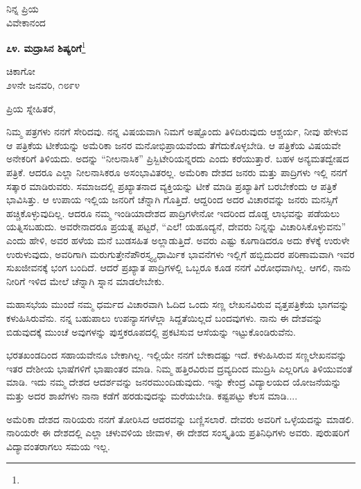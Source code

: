{\flushright
ನಿನ್ನ ಪ್ರಿಯ\\ವಿವೇಕಾನಂದ\par}

\newpage

\begin{center}
\textbf{೭೪. ಮದ್ರಾಸಿನ ಶಿಷ್ಯರಿಗೆ}\footnote{}
\end{center}

\begin{flushright}
ಚಿಕಾಗೋ\\೨೪ನೇ ಜನವರಿ, ೧೮೯೪
\end{flushright}

\noindent
ಪ್ರಿಯ ಸ್ನೇಹಿತರೆ,

ನಿಮ್ಮ ಪತ್ರಗಳು ನನಗೆ ಸೇರಿದವು. ನನ್ನ ವಿಷಯವಾಗಿ ನಿಮಗೆ ಅಷ್ಟೊಂದು ತಿಳಿದಿರುವುದು ಆಶ್ಚರ್ಯ, ನೀವು ಹೇಳುವ ಆ ಪತ್ರಿಕೆಯ ಟೀಕೆಯನ್ನು ಅಮೆರಿಕಾ ಜನರ ಮನೋಭಿಪ್ರಾಯವೆಂದು ತೆಗೆದುಕೊಳ್ಳಬೇಡಿ. ಆ ಪತ್ರಿಕೆಯ ವಿಷಯವೇ ಅನೇಕರಿಗೆ ತಿಳಿಯದು. ಅದನ್ನು “ನೀಲನಾಸಿಕ” ಪ್ರಿಸ್ಬಿಟೇರಿಯನ್ನರದು ಎಂದು ಕರೆಯುತ್ತಾರೆ. ಬಹಳ ಅನ್ಯಮತದ್ವೇಷದ ಪತ್ರಿಕೆ. ಆದರೂ ಎಲ್ಲಾ ನೀಲನಾಸಿಕರೂ ಅಸಂಭಾವಿತರಲ್ಲ. ಅಮೆರಿಕಾ ದೇಶದ ಜನರು ಮತ್ತು ಪಾದ್ರಿಗಳು ಇಲ್ಲಿ ನನಗೆ ಸತ್ಕಾರ ಮಾಡಿರುವರು. ಸಮಾಜದಲ್ಲಿ ಪ್ರಖ್ಯಾತನಾದ ವ್ಯಕ್ತಿಯನ್ನು ಟೀಕೆ ಮಾಡಿ ಪ್ರಖ್ಯಾತಿಗೆ ಬರಬೇಕೆಂದು ಆ ಪತ್ರಿಕೆ ಭಾವಿಸಿತ್ತು. ಆ ಉಪಾಯ ಇಲ್ಲಿಯ ಜನರಿಗೆ ಚೆನ್ನಾಗಿ ಗೊತ್ತಿದೆ. ಆದ್ದರಿಂದ ಅದರ ವಿಚಾರವನ್ನು ಜನರು ಮನಸ್ಸಿಗೆ ಹಚ್ಚಿಕೊಳ್ಳುವುದಿಲ್ಲ. ಆದರೂ ನಮ್ಮ ಇಂಡಿಯಾದೇಶದ ಪಾದ್ರಿಗಳೇನೋ ಇದರಿಂದ ದೊಡ್ಡ ಲಾಭವನ್ನು ಪಡೆಯಲು ಯತ್ನಿಸಬಹುದು. ಅವರೇನಾದರೂ ಪ್ರಯತ್ನ ಪಟ್ಟರೆ, “ಎಲೆ! ಯಹೂದ್ಯನೆ, ದೇವರು ನಿನ್ನನ್ನು ವಿಚಾರಿಸಿಕೊಳ್ಳುವನು” ಎಂದು ಹೇಳಿ, ಅವರ ಹಳೆಯ ಮನೆ ಬುಡಸಹಿತ ಅಲ್ಲಾಡುತ್ತಿದೆ. ಅವರು ಎಷ್ಟು ಕೂಗಾಡಿದರೂ ಅದು ಕೆಳಕ್ಕೆ ಉರುಳೇ ಉರುಳುವುದು, ಅವರಿಗಾಗಿ ಮರುಗುತ್ತೇನೆ\enginline{-}ಪೌರಸ್ತ್ಯ್ಯ ಧಾರ್ಮಿಕ ಭಾವನೆಗಳು ಇಲ್ಲಿಗೆ ಹಬ್ಬಿದುದರ ಪರಿಣಾಮವಾಗಿ ಇವರ ಸುಖಜೀವನಕ್ಕೆ ಭಂಗ ಬಂದಿದೆ. ಆದರೆ ಪ್ರಖ್ಯಾತ ಪಾದ್ರಿಗಳಲ್ಲಿ ಒಬ್ಬರೂ ಕೂಡ ನನಗೆ ವಿರೋಧವಾಗಿಲ್ಲ. ಆಗಲಿ, ನಾನು ನೀರಿಗೆ ಇಳಿದ ಮೇಲೆ ಚೆನ್ನಾಗಿ ಸ್ನಾನ ಮಾಡಲೇಬೇಕು.

ಮಹಾಸಭೆಯ ಮುಂದೆ ನಮ್ಮ ಧರ್ಮದ ವಿಚಾರವಾಗಿ ಓದಿದ ಒಂದು ಸಣ್ಣ ಲೇಖನವಿರುವ ವೃತ್ತಪತ್ರಿಕೆಯ ಭಾಗವನ್ನು ಕಳುಹಿಸಿರುವೆನು. ನನ್ನ ಬಹುಪಾಲು ಉಪನ್ಯಾಸಗಳೆಲ್ಲಾ ಸಿದ್ದತೆಯಿಲ್ಲದೆ ಬಂದವುಗಳು. ನಾನು ಈ ದೇಶವನ್ನು ಬಿಡುವುದಕ್ಕೆ ಮುಂಚೆ ಅವುಗಳನ್ನು ಪುಸ್ತಕರೂಪದಲ್ಲಿ ಪ್ರಕಟಿಸುವ ಆಸೆಯನ್ನು ಇಟ್ಟುಕೊಂಡಿರುವೆನು.

ಭರತಖಂಡದಿಂದ ಸಹಾಯವೇನೂ ಬೇಕಾಗಿಲ್ಲ. ಇಲ್ಲಿಯೇ ನನಗೆ ಬೇಕಾದಷ್ಟು ಇದೆ. ಕಳುಹಿಸಿರುವ ಸಣ್ಣಲೇಖನವನ್ನು ಇತರ ದೇಶೀಯ ಭಾಷೆಗಳಿಗೆ ಭಾಷಾಂತರ ಮಾಡಿ. ನಿಮ್ಮ ಹತ್ತಿರವಿರುವ ದ್ರವ್ಯದಿಂದ ಮುದ್ರಿಸಿ ಎಲ್ಲರಿಗೂ ತಿಳಿಯುವಂತೆ ಮಾಡಿ. ಇದು ನಮ್ಮ ದೇಶದ ಆದರ್ಶವನ್ನು ಜನರಮುಂದಿಡುವುದು. ಇನ್ನು ಕೇಂದ್ರ ವಿದ್ಯಾಲಯದ ಯೋಜನೆಯನ್ನು ಮತ್ತು ಅದರ ಶಾಖೆಗಳು ನಾನಾ ಕಡೆಗೆ ಹರಡುವುದನ್ನು ಮರೆಯಬೇಡಿ. ಕಷ್ಟಪಟ್ಟು ಕೆಲಸ ಮಾಡಿ....

ಅಮೆರಿಕಾ ದೇಶದ ನಾರಿಯರು ನನಗೆ ತೋರಿಸಿದ ಆದರವನ್ನು ಬಣ್ಣಿಸಲಾರೆ. ದೇವರು ಅವರಿಗೆ ಒಳ್ಳೆಯದನ್ನು ಮಾಡಲಿ. ನಾರಿಯರೇ ಈ ದೇಶದಲ್ಲಿ ಎಲ್ಲಾ ಚಳುವಳಿಯ ಜೀವಾಳ, ಈ ದೇಶದ ಸಂಸ್ಕೃತಿಯ ಪ್ರತಿನಿಧಿಗಳು ಅವರು. ಪುರುಷರಿಗೆ ವಿದ್ಯಾವಂತರಾಗಲು ಸಮಯ ಇಲ್ಲ.

